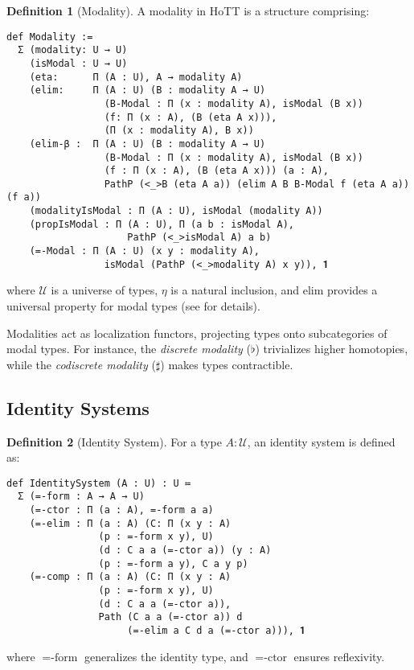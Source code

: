 \documentclass[12pt]{article}
\theoremstyle{definition}
\newtheorem{definition}{Definition}
\theoremstyle{plain}
\begin{document}
\begin{definition}[Modality]
A modality in HoTT is a structure comprising:
\begin{lstlisting}[mathescape=true]
def Modality :=
  Σ (modality: U → U)
    (isModal : U → U)
    (eta:      Π (A : U), A → modality A)
    (elim:     Π (A : U) (B : modality A → U)
                 (B-Modal : Π (x : modality A), isModal (B x))
                 (f: П (x : A), (B (eta A x))),
                 (Π (x : modality A), B x))
    (elim-β :  Π (A : U) (B : modality A → U)
                 (B-Modal : Π (x : modality A), isModal (B x))
                 (f : Π (x : A), (B (eta A x))) (a : A),
                 PathP (<_>B (eta A a)) (elim A B B-Modal f (eta A a)) (f a))
    (modalityIsModal : Π (A : U), isModal (modality A))
    (propIsModal : Π (A : U), Π (a b : isModal A),
                     PathP (<_>isModal A) a b)
    (=-Modal : Π (A : U) (x y : modality A),
                 isModal (PathP (<_>modality A) x y)), 𝟏
\end{lstlisting}
where $\mathcal{U}$ is a universe of types, $\eta$ is a natural inclusion, and $\text{elim}$ provides a universal property for modal types (see \cite{shulman2018modal} for details).
\end{definition}

Modalities act as localization functors, projecting types onto subcategories of modal types. For instance, the \emph{discrete modality} ($\flat$) trivializes higher homotopies, while the \emph{codiscrete modality} ($\sharp$) makes types contractible.

\newpage
\subsection{Identity Systems}

\begin{definition}[Identity System]
For a type $A: \mathcal{U}$, an identity system is defined as:
\begin{lstlisting}[mathescape=true]
def IdentitySystem (A : U) : U ≔
  Σ (=-form : A → A → U)
    (=-ctor : Π (a : A), =-form a a)
    (=-elim : Π (a : A) (C: Π (x y : A)
                (p : =-form x y), U)
                (d : C a a (=-ctor a)) (y : A)
                (p : =-form a y), C a y p)
    (=-comp : Π (a : A) (C: Π (x y : A)
                (p : =-form x y), U)
                (d : C a a (=-ctor a)),
                Path (C a a (=-ctor a)) d
                     (=-elim a C d a (=-ctor a))), 𝟏
\end{lstlisting}
where $=\text{-form}$ generalizes the identity type, and $=\text{-ctor}$ ensures reflexivity.
\end{definition}
\end{document}
